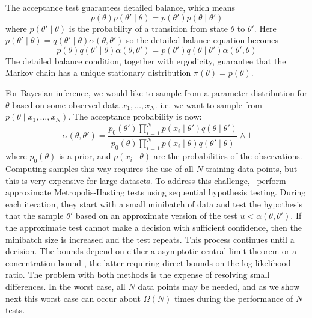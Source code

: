 \documentclass{article}
\begin{document}
The acceptance test guarantees detailed balance, which means
\begin{equation}\label{detailed_balance1}
  p(\theta)p(\theta'\mid\theta) = p(\theta')p(\theta \mid\theta')
\end{equation}
where $p(\theta'\mid\theta)$ is the probability of a transition from state $\theta$ to $\theta'$. Here
$p(\theta'\mid\theta) = q(\theta'\mid\theta)\alpha(\theta,\theta')$ so the detailed balance equation becomes
\begin{equation}\label{detailed_balance2}
  p(\theta)q(\theta'\mid\theta)\alpha(\theta,\theta') = p(\theta')q(\theta\mid\theta')\alpha(\theta',\theta)
\end{equation}
The detailed balance condition, together with ergodicity, guarantee that the
Markov chain has a unique stationary distribution $\pi(\theta) = p(\theta)$.

For Bayesian inference, we would like to sample from a parameter distribution for $\theta$ based on some
observed data $x_1,\ldots,x_N$. i.e. we want to sample from 
$p(\theta \mid x_1, \ldots, x_N)$. The acceptance probability is now:
\begin{equation}
\alpha(\theta,\theta') = 
 \frac{p_0(\theta')\prod_{i=1}^N p(x_i \mid \theta')q(\theta \mid
\theta')}{p_0(\theta)\prod_{i=1}^N p(x_i \mid \theta)q(\theta' \mid\theta)} \wedge 1
\end{equation}
where $p_0(\theta)$ is a prior, and $p(x_i \mid \theta)$ are the
probabilities of the observations. Computing samples this way requires
the use of all $N$ training data points, but this is very expensive
for large datasets. To address this challenge,~\cite{cutting_mh_2014,icml2014c1_bardenet14} perform
approximate Metropolis-Hasting tests using sequential hypothesis
testing. During each iteration, they start with a small minibatch of
data and test the hypothesis that the sample $\theta'$ based on an
approximate version of the test $u < \alpha(\theta,\theta')$. If the
approximate test cannot make a decision with sufficient confidence,
then the minibatch size is increased and the test repeats. This
process continues until a decision. The bounds depend on either a
asymptotic central limit theorem \cite{cutting_mh_2014} or a
concentration bound \cite{icml2014c1_bardenet14}, the latter requiring
direct bounds on the log likelihood ratio.  The problem with both
methods is the expense of resolving small differences.  In the worst
case, all $N$ data points may be needed, and as we show next this
worst case can occur about $\Omega(N)$ times during the performance of
$N$ tests.
\end{document}
